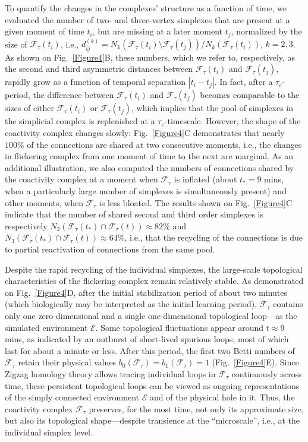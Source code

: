 \documentclass[12pt,tightenlines]{revtex4}
\begin{document}
To quantify the changes in the complexes' structure as a function of time, we evaluated the number of two- and three-vertex 
simplexes that are present at a given moment of time $t_i$, but are missing at a later moment $t_j$, normalized by the size of 
$\mathcal{F}_{\tau}(t_i)$, i.e., $d^{(k)}_{ij} = N_k(\mathcal{F}_{\tau}(t_i)\setminus\mathcal{F}_{\tau}(t_j))/N_k(\mathcal{F}_{\tau}(t_i))$, 
$k = 2,3$. As shown on Fig.~\ref{Figure4}B, these numbers, which we refer to, respectively, as the second and third asymmetric 
distances between $\mathcal{F}_{\tau}(t_i)$ and $\mathcal{F}_{\tau}(t_j)$, rapidly grow as a function of temporal separation 
$|t_i - t_j|$. In fact, after a $\tau_{e}$-period, the difference between $\mathcal{F}_{\tau}(t_i)$ and $\mathcal{F}_{\tau}(t_j)$ 
becomes comparable to the sizes of either $\mathcal{F}_{\tau}(t_i)$ or $\mathcal{F}_{\tau}(t_j)$, which implies that the pool 
of simplexes in the simplicial complex is replenished at a $\tau_{e}$-timescale. However, the shape of the coactivity complex 
changes slowly: Fig.~\ref{Figure4}C demonstrates that nearly $100\%$ of the connections are shared at two consecutive moments, 
i.e., the changes in flickering complex from one moment of time to the next are marginal. As an additional illustration, we also 
computed the numbers of connections shared by the coactivity complex at a moment when $\mathcal{F}_{\tau}$ is inflated 
(about $t_{*} = 9$ mins, when a particularly large number of simplexes is simultaneously present) and other moments, when 
$\mathcal{F}_{\tau}$ is less bloated. The results shown on Fig.~\ref{Figure4}C indicate that the number of shared second and 
third order simplexes is respectively $N_2(\mathcal{F}_{\tau}(t_{*})\cap \mathcal{F}_{\tau}(t)) \approx 82\%$ and 
$N_3(\mathcal{F}_{\tau}(t_{*})\cap \mathcal{F}_{\tau}(t)) \approx 64\%$, i.e., that the recycling of the connections is due to 
partial reactivation of connections from the same pool.

Despite the rapid recycling of the individual simplexes, the large-scale topological characteristics of the flickering complex remain 
relatively stable. As demonstrated on Fig.~\ref{Figure4}D, after the initial stabilization period of about two minutes (which 
biologically may be interpreted as the initial learning period), $\mathcal{F}_{\tau}$ contains only one zero-dimensional and a 
single one-dimensional topological loop---as the simulated environment $\mathcal{E}$. Some topological fluctuations appear 
around $t \approx 9$ mins, as indicated by an outburst of short-lived spurious loops, most of which last for about a minute or 
less. After this period, the first two Betti numbers of $\mathcal{F}_{\tau}$ retain their physical values $b_0(\mathcal{F}_{\tau}) 
= b_1(\mathcal{F}_{\tau}) = 1$ (Fig.~\ref{Figure4}E). Since Zigzag homology theory allows tracing individual loops in 
$\mathcal{F}_{\tau}$ continuously across time, these persistent topological loops can be viewed as ongoing representations of 
the simply connected environment $\mathcal{E}$ and of the physical hole in it. Thus, the coactivity complex $\mathcal{F}_{\tau}$ 
preserves, for the most time, not only its approximate size, but also its topological shape---despite transience at the ``microscale'', 
i.e., at the individual simplex level. 
\end{document}
